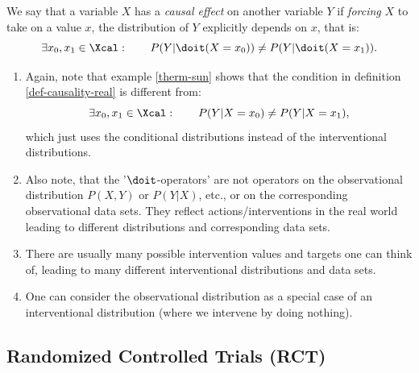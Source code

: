 \begin{Def}
    \label{def-causality-real}
    We say that a variable $X$ has a \emph{causal effect} on another variable $Y$ if
    \emph{forcing} $X$ to take on a value $x$, the distribution of $Y$ explicitly depends on $x$, that is:
    \[ \exists x_0,x_1 \in \Xcal:\qquad P(Y|\doit(X=x_0)) \neq P(Y|\doit(X=x_1)). \]
\end{Def}

\begin{Rem}
    \begin{enumerate}
        \item 
    Again, note that example \ref{therm-sun} shows that the condition in definition \ref{def-causality-real} is different from:
    \[ \exists x_0,x_1 \in \Xcal:\qquad P(Y|X=x_0) \neq P(Y|X=x_1), \]
    which just uses the conditional distributions instead of the interventional distributions.
        \item Also note, that the '$\doit$-operators' are not operators on the observational distribution $P(X,Y)$ or $P(Y|X)$, etc., or on the corresponding observational data sets. They reflect actions/interventions in the real world leading to different distributions and corresponding data sets. 
        \item There are usually many possible intervention values and targets one can think of, leading to many different interventional distributions and data sets.
        \item One can consider the observational distribution as a special case of an interventional distribution (where we intervene by doing nothing).
    \end{enumerate}
\end{Rem}


\subsection{Randomized Controlled Trials (RCT)} %


